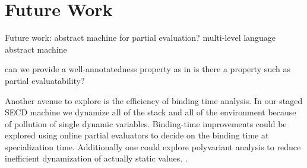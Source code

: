 \documentclass[a4paper,12pt,twoside,openright]{report}
\theoremstyle{definition}
\begin{document}
\section{Future Work}\label{sec:future}
Future work:
abstract machine for partial evaluation? multi-level language abstract machine

can we provide a well-annotatedness property as in \cite{gomard1991partial}
is there a property such as partial evaluatability?

Another avenue to explore is the efficiency of binding time analysis. In our staged SECD machine we dynamize all of the stack and all of the environment because of pollution of single dynamic variables. Binding-time improvements could be explored using online partial evaluators to decide on the binding time at specialization time. Additionally one could explore polyvariant analysis to reduce inefficient dynamization of actually static values. \cite{danvy1995essence}.

\end{document}
